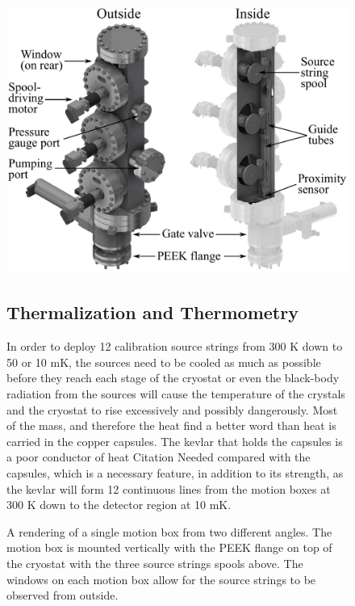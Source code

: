 \begin{figure}[htpb]
\includegraphics[width=0.9\linewidth]{Figures/motion_box.pdf}
\caption[A rendering of a single motion box from two different angles.]{A rendering of a single motion box from two different angles. The motion box is mounted vertically with the PEEK flange on top of the cryostat with the three source strings spools above. The windows on each motion box allow for the source strings to be observed from outside.}
\label{fig:motion_box}

\subsection{Thermalization and Thermometry}
In order to deploy 12 calibration source strings from 300 K down to 50 or 10 mK, the sources need to be cooled as much as possible before they reach each stage of the cryostat or even the black-body radiation from the sources will cause the temperature of the crystals and the cryostat to rise excessively and possibly dangerously. Most of the mass, and therefore the heat \color{red} find a better word than heat \color{black} is carried in the copper capsules. The kevlar that holds the capsules is a poor conductor of heat \color{red} Citation Needed \color{black} compared with the capsules, which is a necessary feature, in addition to its strength, as the kevlar will form 12 continuous lines from the motion boxes at 300 K down to the detector region at 10 mK.


\end{figure}
